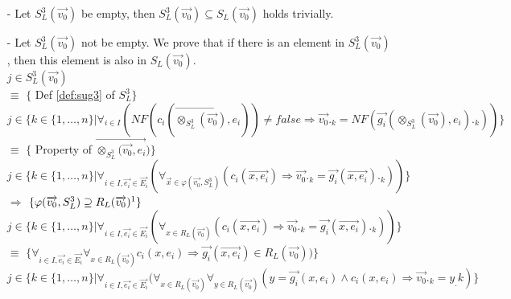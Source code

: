 \index{}\documentclass[a4paper,10pt]{article}
\theoremstyle{plain}
\theoremstyle{definition}
\newcommand{\ovr}{\overrightarrow}
\begin{document}
\begin{itemize}
\newcommand{\tmp}{\vspace{8pt}}

\item[-] Let $S_L^3(\ovr{v_0})$ be empty, then $S_L^3(\ovr{v_0}) \subseteq S_L(\ovr{v_0})$ holds trivially.
\item[-] Let $S_L^3(\ovr{v_0})$ not be empty. We prove that if there is an element in $S_L^3(\ovr{v_0})$, then this element is also in $S_L(\ovr{v_0})$. \\ \tmp
\tmp $ j \in S_L^3(\ovr{v_0})$ \\
\tmp $ \equiv $ \hspace{20pt} $\lbrace$ Def \ref{def:sug3} of $S_L^3 \rbrace$ \\
\tmp $ j \in \lbrace k \in \lbrace 1, \ldots, n \rbrace \vert \forall_{i \in I}(NF(c_i(\ovr{\otimes_{S_L^3}(\ovr{v_0}), e_i})) \neq false \Rightarrow \ovr{v_0}._k = NF(\ovr{g_i}(\otimes_{S_L^3}(\ovr{v_0}), e_i)._k) ) \rbrace$ \\
\tmp $ \equiv $ \hspace{20pt} $\lbrace$ Property of $\ovr{\otimes_{S_L^3}(\ovr{v_0},e_i})\rbrace$ \\
\tmp $ j \in \lbrace k \in \lbrace 1, \ldots, n \rbrace \vert \forall_{i \in I, \ovr{e_i} \in \ovr{E_i}}(\forall_{\ovr{x} \in
 \varphi(\ovr{v_0},S_L^3)
}(c_i(\ovr{x, e_i}) \Rightarrow \ovr{v_0}._k = \ovr{g_i}(\ovr{x, e_i})._k )) \rbrace$\\
\tmp $ \Rightarrow$ \hspace{20pt} $\lbrace  \varphi(\ovr{v_0},S_L^3) \supseteq R_L(\ovr{v_0}) \footnote{See Example \ref{example:proof3}} \rbrace$  \\
\tmp $ j \in \lbrace k \in \lbrace 1, \ldots, n \rbrace \vert \forall_{i \in I, \ovr{e_i} \in \ovr{E_i}}(\forall_{x \in R_L(\ovr{v_0})}( c_i(\ovr{x, e_i})  \Rightarrow \ovr{v_0}._k = \ovr{g_i}(\ovr{x, e_i})._k )) \rbrace$\\
\tmp $ \equiv $ \hspace{20pt} $\lbrace \forall_{i \in I, \ovr{e_i} \in \ovr{E_i}} \forall_{x \in R_L(\ovr{v_0})} c_i(x,e_i) \Rightarrow \ovr{g_i}(\ovr{x, e_i}) \in R_L(\ovr{v_0}) ) \rbrace$\\
\tmp $j \in \lbrace k \in \lbrace 1, \ldots, n \rbrace \vert \forall_{i \in I, \ovr{e_i} \in \ovr{E_i}}(\forall_{x \in R_L(\ovr{v_0})} \forall_{y \in R_L(\ovr{v_0})} (y = \ovr{g_i}(x,e_i) \wedge c_i(x, e_i) \Rightarrow \ovr{v_0}._k = y_.k )  \rbrace $\\

\end{itemize}
\end{document}
